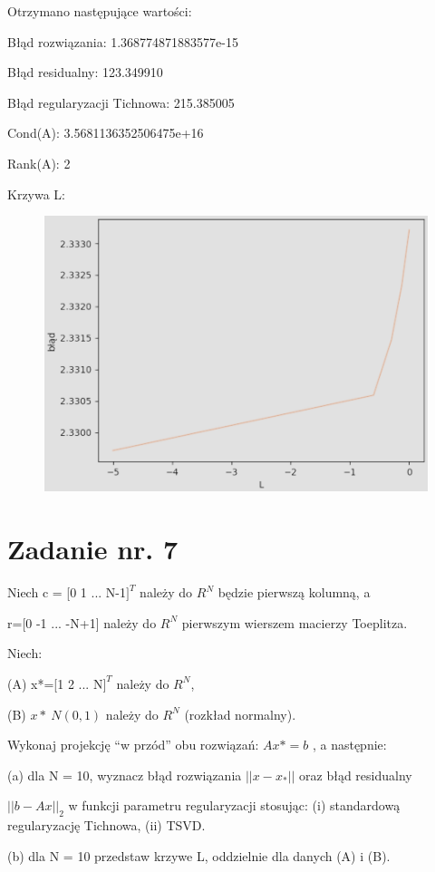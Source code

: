 \documentclass{article}
\begin{document}
 

Otrzymano następujące wartości: 

Błąd rozwiązania: 1.368774871883577e-15 

Błąd residualny: 123.349910 

Błąd regularyzacji Tichnowa: 215.385005 

Cond(A): 3.5681136352506475e+16 

Rank(A): 2 

Krzywa L: 
\begin{figure}[h]
  \includegraphics[scale=0.7]{Krzywa_L.png}
  \centering
  \end{figure}

\section{Zadanie nr. 7}
Niech c = [0 1 ... N-1$]^T$ należy do $ R^N$ będzie pierwszą kolumną, a

r=[0 -1 ... -N+1] należy do $ R^N$ pierwszym wierszem macierzy Toeplitza.

Niech:

(A) x*=[1 2 ... N$]^T$ należy do $ R^N$,

(B) $x*~N(0,1)$ należy do $R^N$ (rozkład normalny).

Wykonaj projekcję “w przód” obu rozwiązań: $Ax*=b$ , a następnie:

(a) dla N = 10, wyznacz błąd rozwiązania $||x-x_*||$ oraz błąd residualny 

$||b-Ax||_2$ w funkcji parametru regularyzacji stosując: (i) standardową regularyzację Tichnowa,
(ii) TSVD.

(b) dla N = 10 przedstaw krzywe L, oddzielnie dla danych (A) i (B).
\end{document}
